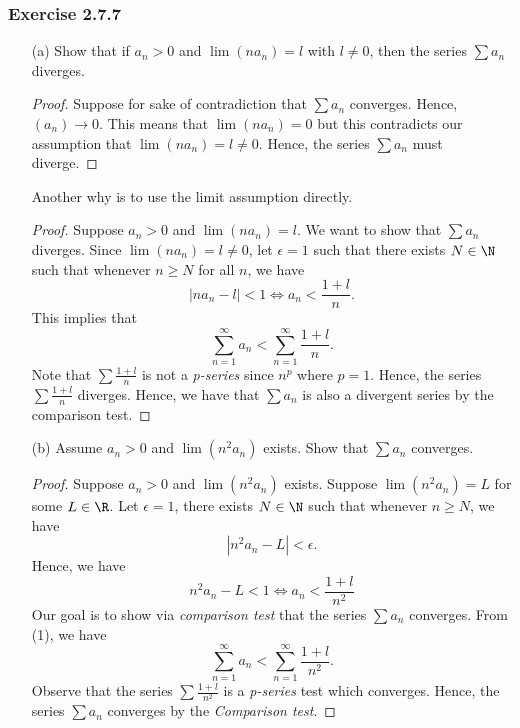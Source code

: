 \subsubsection{Exercise 2.7.7}
\begin{enumerate}
    \item[(a)] Show that if \( a_n > 0 \) and \( \lim (na_n) = l  \) with \( l \neq 0 \), then the series \( \sum a_n \) diverges.
        \begin{proof}
        Suppose for sake of contradiction that \( \sum a_n  \) converges. Hence, \( (a_n) \to 0 \). This means that \( \lim (na_n) = 0 \) but this contradicts our assumption that \( \lim (na_n) = l \neq 0 \). Hence, the series \( \sum a_n \) must diverge. 
        \end{proof}
        Another why is to use the limit assumption directly. 
        \begin{proof}
        Suppose \( a_n > 0 \) and \( \lim (na_n) = l \). We want to show that \( \sum a_n  \) diverges. Since \( \lim (na_n) = l \neq 0 \), let \( \epsilon = 1  \) such that there exists \( N \in \N \) such that whenever \( n \geq N \) for all \( n \), we have 
        \[ |na_n - l | < 1 \iff a_n < \frac{1+ l }{n }. \]
        This implies that 
        \[ \sum_{n=1}^{\infty } a_n < \sum_{n=1}^{\infty} \frac{1+l}{n}.\]
        Note that \( \sum \frac{1+l }{n} \) is not a \textit{p-series} since \( n^p\) where \(p=1\). Hence, the series \( \sum \frac{1+l}{n}\) diverges. Hence, we have that \( \sum a_n \) is also a divergent series by the comparison test. 
        \end{proof}
    \item[(b)] Assume \( a_n > 0 \) and \( \lim (n^2 a_n )\) exists. Show that \( \sum a_n \) converges. 
        \begin{proof}
            Suppose \( a_n > 0 \) and \( \lim (n^2 a_n )\) exists. Suppose \( \lim (n^2 a_n  ) = L \) for some \( L \in \R \). Let \( \epsilon = 1 \), there exists \(  N \in \N \) such that whenever \( n \geq N \), we have 
            \[ |n^2a_n - L | < \epsilon.\]
        Hence, we have
        \[ n^2 a_n - L < 1 \iff a_n < \frac{1+ l }{n^2 } \tag{1}\]
        Our goal is to show via \textit{comparison test} that the series \( \sum a_n \) converges.
        From (1), we have 
        \[\sum_{n=1}^{\infty} a_n < \sum_{n=1}^{\infty} \frac{1 + l }{n^2 }.  \]
        Observe that the series \( \sum \frac{1+l}{n^2} \) is a \textit{p-series} test which converges. Hence, the series \( \sum a_n \) converges by the \textit{Comparison test}.
        \end{proof}
\end{enumerate}


